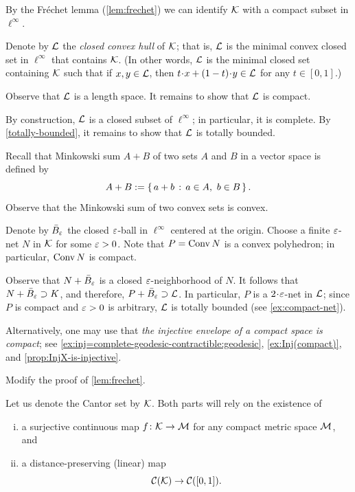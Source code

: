 \setcounter{eqtn}{0}

By the Fréchet lemma (\ref{lem:frechet}) we can identify $\mathcal{K}$ with a compact subset in $\ell^\infty$.

Denote by $\mathcal{L}$ the \emph{closed convex hull} of $\mathcal{K}$;
that is, $\mathcal{L}$ is the minimal convex closed set in $\ell^\infty$ that contains $\mathcal{K}$.
(In other words, $\mathcal{L}$ is the minimal closed set containing $\mathcal{K}$ such that if $x,y\in \mathcal{L}$, then 
$t\cdot x+(1-t)\cdot y\in \spc{L}$ for any $t\in[0,1]$.)

Observe that $\mathcal{L}$ is a length space.
It remains to show that $\mathcal{L}$ is compact.

By construction, $\mathcal{L}$ is a closed subset of $\ell^\infty$; in particular, it is complete.
By \ref{totally-bounded}, it remains to show that $\mathcal{L}$ is totally bounded.

Recall that Minkowski sum $A + B$ of two sets $A$ and $B$ in a vector space is defined by
\[A + B 
\mathrel{:=}
\left\{\,{a+b}\,:\,{a\in A,\ b\in B}\,\right\}.\]
Observe that the Minkowski sum of two convex sets is convex.

Denote by $\bar B_\varepsilon$ the closed $\varepsilon$-ball in $\ell^\infty$ centered at the origin.
Choose a finite $\varepsilon$-net $N$ in $\mathcal{K}$ for some $\varepsilon>0$.
Note that $P=\mathop{\rm Conv}\nolimits N$ is a convex polyhedron; in particular, $\mathop{\rm Conv}\nolimits N$ is compact.

Observe that $N+\bar B_\varepsilon$ is a closed $\varepsilon$-neighborhood of $N$.
It follows that $N+\bar B_\varepsilon\supset K$, and therefore, $P+\bar B_\varepsilon\supset \mathcal{L}$.
In particular, $P$ is a $2\cdot\eps$-net in $\mathcal{L}$;
since $P$ is compact and $\varepsilon>0$ is arbitrary, $\mathcal{L}$ is totally bounded (see \ref{ex:compact-net}).

Alternatively, one may use that \textit{the injective envelope of a compact space is compact}; see \ref{ex:inj=complete-geodesic-contractible:geodesic}, \ref{ex:Inj(compact)}, and \ref{prop:InjX-is-injective}.

Modify the proof of \ref{lem:frechet}.

Let us denote the Cantor set by $\mathcal{K}$.
Both parts will rely on the existence of
\begin{enumerate}[(i)]
\item\label{ex:banach:surjective} a surjective continuous map $f\colon\mathcal{K}\to \mathcal{M}$ for any compact metric space $\mathcal{M}$, and
\item\label{ex:banach:embedding} a distance-preserving (linear) map
\[\mathcal{C}(\mathcal{K})\to \mathcal{C}([0,1]).\]
\end{enumerate}

